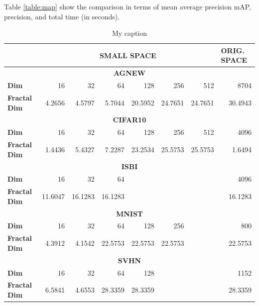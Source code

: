 \documentclass{article}
\begin{document}
Table  \ref{table:map} show the comparison in terms of mean average precision mAP, precision, and total time (in seconds).


\begin{table}[ht]
\centering
\caption{My caption}
\label{my-label}
\begin{tabular}{|l|r|r|r|r|r|r|r|}
\hline
                     & \multicolumn{6}{c|}{\textbf{SMALL SPACE}}                 & \multicolumn{1}{l|}{\textbf{ORIG. SPACE}} \\ \hline
\multicolumn{8}{|c|}{\textbf{AGNEW}}                                                                                         \\ \hline
\textbf{Dim}         & 16      & 32      & 64      & 128     & 256     & 512     & 8704                                      \\ \hline
\textbf{Fractal Dim} & 4.2656  & 4.5797  & 5.7044  & 20.5952 & 24.7651 & 24.7651 & 30.4943                                   \\ \hline
\multicolumn{8}{|c|}{\textbf{CIFAR10}}                                                                                       \\ \hline
\textbf{Dim}         & 16      & 32      & 64      & 128     & 256     & 512     & 4096                                      \\ \hline
\textbf{Fractal Dim} & 1.4436  & 5.4327  & 7.2287  & 23.2534 & 25.5753 & 25.5753 & 1.6494                                    \\ \hline
\multicolumn{8}{|c|}{\textbf{ISBI}}                                                                                          \\ \hline
\textbf{Dim}         & 16      & 32      & 64      &         &         &         & 4096                                      \\ \hline
\textbf{Fractal Dim} & 11.6047 & 16.1283 & 16.1283 &         &         &         & 16.1283                                   \\ \hline
\multicolumn{8}{|c|}{\textbf{MNIST}}                                                                                         \\ \hline
\textbf{Dim}         & 16      & 32      & 64      & 128     & 256     &         & 800                                       \\ \hline
\textbf{Fractal Dim} & 4.3912  & 4.1542  & 22.5753 & 22.5753 & 22.5753 &         & 22.5753                                   \\ \hline
\multicolumn{8}{|c|}{\textbf{SVHN}}                                                                                          \\ \hline
\textbf{Dim}         & 16      & 32      & 64      & 128     &         &         & 1152                                      \\ \hline
\textbf{Fractal Dim} & 6.5841  & 4.6553  & 28.3359 & 28.3359 &         &         & 28.3359                                   \\ \hline
\end{tabular}
\end{table}
\end{document}
